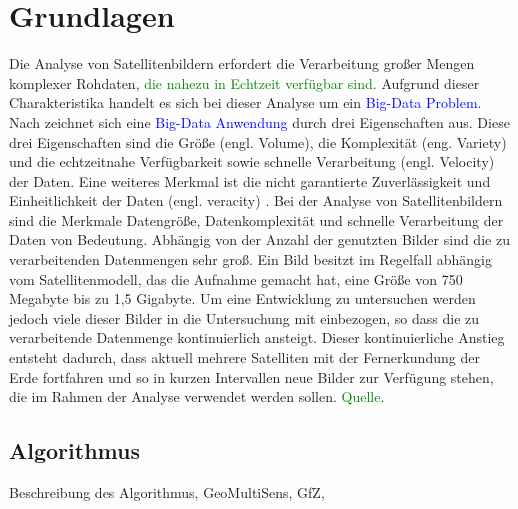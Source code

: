 \chapter{Grundlagen}
Die Analyse von Satellitenbildern erfordert die Verarbeitung großer Mengen komplexer Rohdaten, \textcolor{green}{die nahezu in Echtzeit verfügbar sind}. Aufgrund dieser Charakteristika handelt es sich bei dieser Analyse um ein \textcolor{blue}{Big-Data Problem}. Nach \cite{Laney2001} zeichnet sich eine \textcolor{blue}{Big-Data Anwendung} durch drei Eigenschaften aus. Diese drei Eigenschaften sind die Größe (engl. Volume), die Komplexität (eng. Variety) und die echtzeitnahe Verfügbarkeit sowie schnelle Verarbeitung (engl. Velocity) der Daten. Eine weiteres Merkmal ist die nicht garantierte Zuverlässigkeit und Einheitlichkeit der Daten (engl. veracity) \cite{Zikopoulos2012}. 
\newline
Bei der Analyse von Satellitenbildern sind die Merkmale Datengröße, Datenkomplexität und schnelle Verarbeitung der Daten von Bedeutung. Abhängig von der Anzahl der genutzten Bilder sind die zu verarbeitenden Datenmengen sehr groß. Ein Bild besitzt im Regelfall abhängig vom Satellitenmodell, das die Aufnahme gemacht hat, eine Größe von 750 Megabyte bis zu 1,5 Gigabyte. Um eine Entwicklung zu untersuchen werden jedoch viele dieser Bilder in die Untersuchung mit einbezogen, so dass die zu verarbeitende Datenmenge kontinuierlich ansteigt. Dieser kontinuierliche Anstieg entsteht dadurch, dass aktuell mehrere Satelliten mit der Fernerkundung der Erde fortfahren und so in kurzen Intervallen neue Bilder zur Verfügung stehen, die im Rahmen der Analyse verwendet werden sollen. \textcolor{green}{Quelle}.

\section{Algorithmus}
Beschreibung des Algorithmus, GeoMultiSens, GfZ, 
\newline

